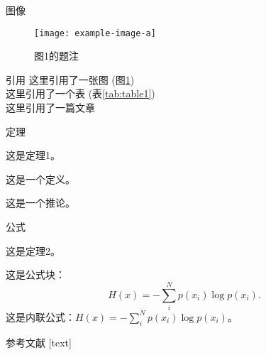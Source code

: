 \documentclass[aspectratio=169,xcolor=dvipsnames, t]{beamer}
\begin{document}
    \begin{frame}{图像}
        \begin{figure}[H]
            \centering
            \texttt{[image: example-image-a]}
            \caption{图1的题注}
            \label{fig:figure1}
        \end{figure}
    \end{frame}

    \begin{frame}{引用}
        这里引用了一张图 (图\ref{fig:figure1})\\
        这里引用了一个表 (表\ref{tab:table1})\\
        这里引用了一篇文章 \cite{vaswani2017attention}\\
    \end{frame}

    \begin{frame}{定理}
        \begin{theorem}
            这是定理1。
        \end{theorem}
        \begin{definition}
            这是一个定义。
        \end{definition}
        \begin{corollary}
            这是一个推论。
        \end{corollary}
    \end{frame}

    \begin{frame}{公式}
        \begin{theorem}
            这是定理2。
        \end{theorem}
        这是公式块：
        \begin{equation}
            H(x)=-\sum\limits_i^Np(x_i)\log p(x_i).
        \end{equation}
        这是内联公式：$H(x)=-\sum\limits_i^Np(x_i)\log p(x_i)$。
    \end{frame}


\begin{frame}[allowframebreaks]{参考文献}
    \newcommand{\ftcmu}{\fontspec{CMU Serif}\selectfont}
    \renewcommand{\bibfont}{\ftcmu}
    [text]
    \vspace{-20pt}
    \begin{multicols}{2}
        \printbibliography[heading=none]
    \end{multicols}
\end{frame}
\end{document}
